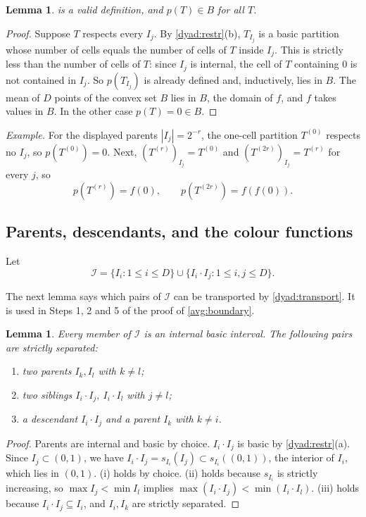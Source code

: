 \documentclass[11pt]{article}
\newtheorem{lemma}[theorem]{Lemma}
\theoremstyle{definition}
\numberwithin{equation}{section}
\begin{document}
\begin{lemma}\label{color:wd}
 is a valid definition, and \(p(T)\in B\) for all \(T\).
\end{lemma}

\begin{proof}
Suppose \(T\) respects every \(I_j\). By \cref{dyad:restr}(b), \(T_{I_j}\)
is a basic partition whose number of cells equals the number of cells of
\(T\) inside \(I_j\). This is strictly less than the number of cells of
\(T\): since \(I_j\) is internal, the cell of \(T\) containing \(0\) is not
contained in \(I_j\). So \(p(T_{I_j})\) is already defined and, inductively,
lies in \(B\). The mean of \(D\) points of the convex set \(B\) lies in
\(B\), the domain of \(f\), and \(f\) takes values in \(B\). In the other
case \(p(T)=0\in B\).
\end{proof}

\emph{Example.} For the displayed parents \(|I_j|=2^{-r}\), the one-cell
partition \(T^{(0)}\) respects no \(I_j\), so \(p(T^{(0)})=0\).
Next, \((T^{(r)})_{I_j}=T^{(0)}\) and \((T^{(2r)})_{I_j}=T^{(r)}\) for every
\(j\), so
\[
  p(T^{(r)})=f(0),\qquad p(T^{(2r)})=f(f(0)).
\]

\subsection{Parents, descendants, and the colour functions}

Let
\[
  \mathcal I=\{I_i:1\le i\le D\}
       \cup\{I_i\cdot I_j:1\le i,j\le D\}.
\]

The next lemma says which pairs of \(\mathcal I\) can be transported by
\cref{dyad:transport}. It is used in Steps 1, 2 and 5 of the proof of
\cref{avg:boundary}.

\begin{lemma}\label{color:pairs}
Every member of \(\mathcal I\) is an internal basic interval. The following
pairs are strictly separated:
\begin{enumerate}[label=(\roman*)]
\item two parents \(I_k,I_l\) with \(k\ne l\);
\item two siblings \(I_i\cdot I_j,\ I_i\cdot I_l\) with \(j\ne l\);
\item a descendant \(I_i\cdot I_j\) and a parent \(I_k\) with \(k\ne i\).
\end{enumerate}
\end{lemma}

\begin{proof}
Parents are internal and basic by choice. \(I_i\cdot I_j\) is basic by
\cref{dyad:restr}(a). Since \(I_j\subset(0,1)\), we have
\(I_i\cdot I_j=s_{I_i}(I_j)\subset s_{I_i}((0,1))\), the interior of
\(I_i\), which lies in \((0,1)\).
(i) holds by choice. (ii) holds because \(s_{I_i}\) is strictly increasing,
so \(\max I_j<\min I_l\) implies
\(\max(I_i\cdot I_j)<\min(I_i\cdot I_l)\). (iii) holds because
\(I_i\cdot I_j\subseteq I_i\), and \(I_i,I_k\) are strictly separated.
\end{proof}
\end{document}
